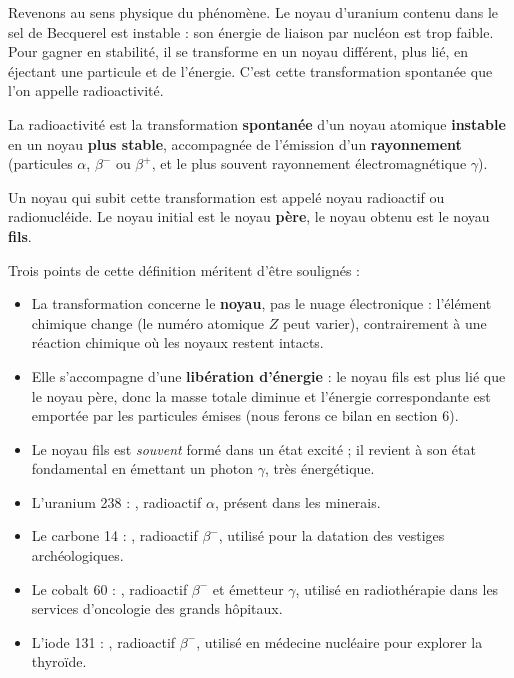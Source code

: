 \documentclass[11pt]{article}
\newcommand{\cle}[1]{{\popxbold\color{popdark}#1}}
\begin{document}
Revenons au sens physique du phénomène. Le noyau d'uranium contenu dans le sel de Becquerel est instable : son énergie de liaison par nucléon est trop faible. Pour gagner en stabilité, il se transforme en un noyau différent, plus lié, en éjectant une particule et de l'énergie. C'est cette transformation spontanée que l'on appelle radioactivité.

\begin{definition}
La \cle{radioactivité} est la transformation \textbf{spontanée} d'un noyau atomique \textbf{instable} en un noyau \textbf{plus stable}, accompagnée de l'émission d'un \textbf{rayonnement} (particules $\alpha$, $\beta^-$ ou $\beta^+$, et le plus souvent rayonnement électromagnétique $\gamma$).

Un noyau qui subit cette transformation est appelé \cle{noyau radioactif} ou \cle{radionucléide}. Le noyau initial est le noyau \textbf{père}, le noyau obtenu est le noyau \textbf{fils}.
\end{definition}

Trois points de cette définition méritent d'être soulignés :

\begin{itemize}
\item La transformation concerne le \textbf{noyau}, pas le nuage électronique : l'élément chimique change (le numéro atomique $Z$ peut varier), contrairement à une réaction chimique où les noyaux restent intacts.
\item Elle s'accompagne d'une \textbf{libération d'énergie} : le noyau fils est plus lié que le noyau père, donc la masse totale diminue et l'énergie correspondante est emportée par les particules émises (nous ferons ce bilan en section 6).
\item Le noyau fils est \emph{souvent} formé dans un état excité ; il revient à son état fondamental en émettant un photon $\gamma$, très énergétique.
\end{itemize}

\begin{exemplebox}
\begin{itemize}
\item L'uranium 238 : , radioactif $\alpha$, présent dans les minerais.
\item Le carbone 14 : , radioactif $\beta^-$, utilisé pour la datation des vestiges archéologiques.
\item Le cobalt 60 : , radioactif $\beta^-$ et émetteur $\gamma$, utilisé en radiothérapie dans les services d'oncologie des grands hôpitaux.
\item L'iode 131 : , radioactif $\beta^-$, utilisé en médecine nucléaire pour explorer la thyroïde.
\end{itemize}
\end{exemplebox}
\end{document}
